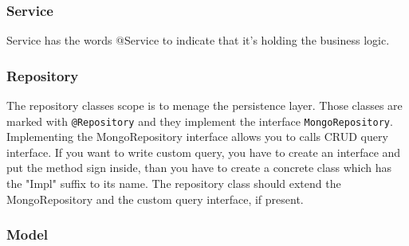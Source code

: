 \subsubsection{Service}
Service has the words @Service to indicate that it’s holding the business logic. 

\subsubsection{Repository}
The repository classes scope is to menage the persistence layer. Those classes are marked with \texttt{@Repository} and they implement the interface \texttt{MongoRepository}. Implementing the MongoRepository interface allows you to calls CRUD query interface. 
If you want to write custom query, you have to create an interface and put the method sign inside, than you have to create a concrete class which has the "Impl" suffix to its name. The repository class should extend the MongoRepository and the custom query interface, if present. 
\subsubsection{Model}
